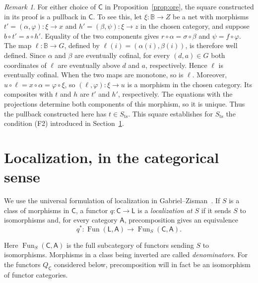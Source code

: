 \documentclass[11pt,a4paper]{article}
\theoremstyle{definition}
\theoremstyle{remark}
\newtheorem{remark}[theorem]{Remark}
\newcommand{\CC}{\mathsf C}
\newcommand{\Fun}{\operatorname{Fun}}
\newcommand{\Sts}{S_{\mathrm{ts}}}
\begin{document}
\begin{remark}
For either choice of \(\CC\) in Proposition~\ref{prop:ore}, the square
constructed in its proof is a pullback in \(\CC\). To see this, let
\(\xi:\mathbb B\to Z\)
be a net with morphisms \(t'=(\alpha,\varphi):\xi\to x\) and
\(h'=(\beta,\psi):\xi\to z\) in the chosen category, and suppose
\(b\circ t'=s\circ h'\). Equality of the two components gives
\(r\circ\alpha=\sigma\circ\beta\) and \(\psi=f\circ\varphi\).
The map \(\ell:\mathbb B\to G\), defined by
\(\ell(i)=(\alpha(i),\beta(i))\), is therefore well defined.
Since \(\alpha\) and \(\beta\) are eventually cofinal, for every
\((d,a)\in G\) both coordinates of \(\ell\) are eventually above
\(d\) and \(a\), respectively. Hence \(\ell\) is eventually cofinal.
When the two maps are monotone, so is \(\ell\). Moreover,
\(u\circ\ell=x\circ\alpha=\varphi\circ\xi\), so
\((\ell,\varphi):\xi\to u\) is a morphism in the chosen category.
Its composites with \(t\) and \(h\) are \(t'\) and \(h'\), respectively.
The equations with the projections determine both components of this
morphism, so it is unique. Thus the pullback constructed here has
\(t\in\Sts\). This square establishes for \(\Sts\) the condition (F2)
introduced in Section~\ref{sec:local}.
\end{remark}

\section{Localization, in the categorical sense}\label{sec:local}
We use the universal formulation of localization in
Gabriel--Zisman~\cite[Chapter I, Section 1.1 and Lemma 1.2]{GZ}.
If \(S\) is a class of morphisms in \(\CC\), a functor
\(q:\CC\to\mathsf L\) is a \emph{localization at \(S\)} if
it sends \(S\) to isomorphisms and, for every category
\(\mathsf A\), precomposition gives an equivalence
\begin{equation}\label{eq:universal}
 q^*:\Fun(\mathsf L,\mathsf A)\to\Fun_S(\CC,\mathsf A).
\end{equation}

Here \(\Fun_S(\CC,\mathsf A)\) is the full subcategory of
functors sending \(S\) to isomorphisms. Morphisms in a class being
inverted are called \emph{denominators}. For the functors
\(Q_{\CC}\) considered below, precomposition will in
fact be an isomorphism of functor categories.
\end{document}
